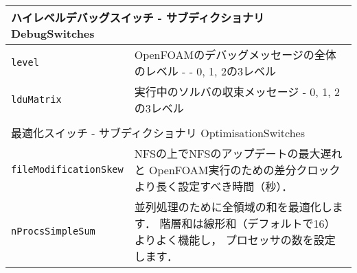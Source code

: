 \begin{tabularx}{\textwidth}{lX}
 \multicolumn{2}{l}{ハイレベルデバッグスイッチ - サブディクショナリ DebugSwitches} \\
 \hline
 \texttt{level} & OpenFOAMのデバッグメッセージの全体のレベル - - 0, 1, 2の3レベル \\
 \texttt{lduMatrix} & 実行中のソルバの収束メッセージ - 0, 1, 2の3レベル \\
 \\
 \multicolumn{2}{l}{最適化スイッチ - サブディクショナリ OptimisationSwitches} \\
 \hline
 \texttt{fileModificationSkew} & NFSの上でNFSのアップデートの最大遅れと
     OpenFOAM実行のための差分クロックより長く設定すべき時間（秒）． \\
 \texttt{nProcsSimpleSum} & 並列処理のために全領域の和を最適化します．
     階層和は線形和（デフォルトで16）よりよく機能し，
     プロセッサの数を設定します． \\
 \hline
\end{tabularx}
